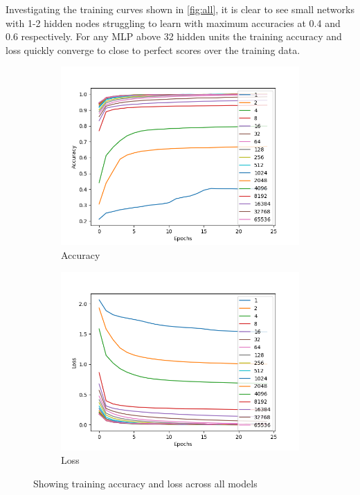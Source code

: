\documentclass[sigconf]{acmart}
\begin{document}
Investigating the training curves shown in \autoref{fig:all}, it is clear to see small networks with 1-2 hidden nodes struggling to learn with maximum accuracies at 0.4 and 0.6 respectively.
For any MLP above 32 hidden units the training accuracy and loss quickly converge to close to perfect scores over the training data.

\begin{figure}
    \centering
    \begin{subfigure}{.25\textwidth}
        \centering
        \includegraphics[width=\linewidth]{../allacc.png}
        \caption{Accuracy}
        \label{fig:allacc}
    \end{subfigure}%
    \begin{subfigure}{.25\textwidth}
        \centering
        \includegraphics[width=\linewidth]{../allLosses.png}
        \caption{Loss}
        \label{fig:allloss}
    \end{subfigure}
    \caption{Showing training accuracy and loss across all models}
    \label{fig:all}
\end{figure}
\end{document}
